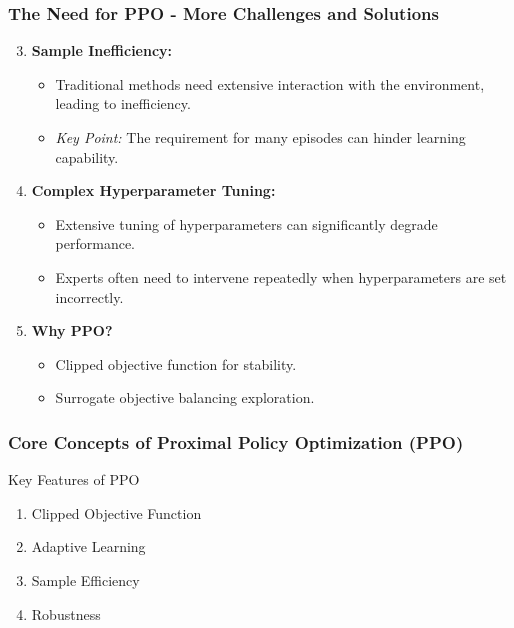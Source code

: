 \documentclass{beamer}
\begin{document}
\begin{frame}[fragile]
    \frametitle{The Need for PPO - More Challenges and Solutions}
    \begin{enumerate}
        \setcounter{enumi}{2} %
        \item \textbf{Sample Inefficiency:}
        \begin{itemize}
            \item Traditional methods need extensive interaction with the environment, leading to inefficiency.
            \item \textit{Key Point:} The requirement for many episodes can hinder learning capability.
        \end{itemize}
        
        \item \textbf{Complex Hyperparameter Tuning:}
        \begin{itemize}
            \item Extensive tuning of hyperparameters can significantly degrade performance.
            \item Experts often need to intervene repeatedly when hyperparameters are set incorrectly.
        \end{itemize}
    
        \item \textbf{Why PPO?} 
        \begin{itemize}
            \item Clipped objective function for stability.
            \item Surrogate objective balancing exploration.
        \end{itemize}
    \end{enumerate}
\end{frame}

\begin{frame}[fragile]
    \frametitle{Core Concepts of Proximal Policy Optimization (PPO)}

    \begin{block}{Key Features of PPO}
        \begin{enumerate}
            \item Clipped Objective Function
            \item Adaptive Learning
            \item Sample Efficiency
            \item Robustness
        \end{enumerate}
    \end{block}
\end{frame}
\end{document}
